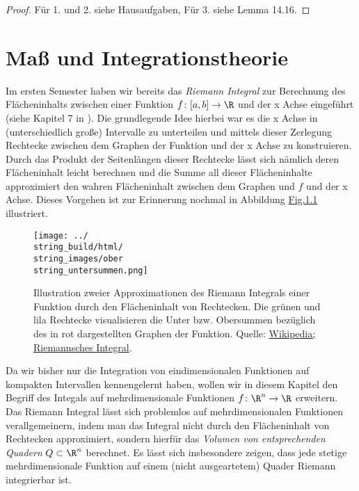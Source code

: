 \documentclass[letterpaper,10pt,english]{jupyterBook}
\begin{document}
\begin{proof}
 Für 1. und 2. siehe Hausaufgaben, Für 3. siehe \cite{Lee03} Lemma 14.16.
\end{proof}


\chapter{Maß  und Integrationstheorie}
\label{\detokenize{masstheorie/intro_masstheorie:masz-und-integrationstheorie}}\label{\detokenize{masstheorie/intro_masstheorie::doc}}
\par
Im ersten Semester haben wir bereits das \emph{Riemann Integral} zur Berechnung des Flächeninhalts zwischen einer Funktion \(f \colon [a,b] \rightarrow \R\) und der x Achse eingeführt (siehe Kapitel 7 in \cite{Bur20}).
Die grundlegende Idee hierbei war es die x Achse in (unterschiedlich große) Intervalle zu unterteilen und mittels dieser Zerlegung Rechtecke zwischen dem Graphen der Funktion und der x Achse zu konstruieren.
Durch das Produkt der Seitenlängen dieser Rechtecke lässt sich nämlich deren Flächeninhalt leicht berechnen und die Summe all dieser Flächeninhalte approximiert den wahren Flächeninhalt zwischen dem Graphen und \(f\) und der x Achse.
Dieses Vorgehen ist zur Erinnerung nochmal in Abbildung \hyperref[\detokenize{masstheorie/intro_masstheorie:fig-riemann-integral}]{Fig.\@ \ref{\detokenize{masstheorie/intro_masstheorie:fig-riemann-integral}}} illustriert.

\begin{figure}[htbp]
\centering


\noindent\texttt{[image: ../\\string\_build/html/\\string\_images/ober\\string\_untersummen.png]}
\caption{Illustration zweier Approximationen des Riemann Integrals einer Funktion durch den Flächeninhalt von Rechtecken. Die grünen und lila Rechtecke visualisieren die Unter  bzw. Obersummen bezüglich des in rot dargestellten Graphen der Funktion. Quelle: \href{https://de.wikipedia.org/wiki/Riemannsches\_Integral}{Wikipedia; Riemannsches Integral}.}\label{\detokenize{masstheorie/intro_masstheorie:fig-riemann-integral}}\end{figure}

\par
Da wir bisher nur die Integration von eindimensionalen Funktionen auf kompakten Intervallen kennengelernt haben, wollen wir in diesem Kapitel den Begriff des Integals auf mehrdimensionale Funktionen \(f \colon \R^n \rightarrow \R\) erweitern.
Das Riemann Integral lässt sich problemlos auf mehrdimensionalen Funktionen verallgemeinern, indem man das Integral nicht durch den Flächeninhalt von Rechtecken approximiert, sondern hierfür das \emph{Volumen von entsprechenden Quadern} \(Q \subset \R^n\) berechnet.
Es lässt sich insbesondere zeigen, dass jede stetige mehrdimensionale Funktion auf einem (nicht ausgeartetem) Quader Riemann integrierbar ist.
\end{document}
